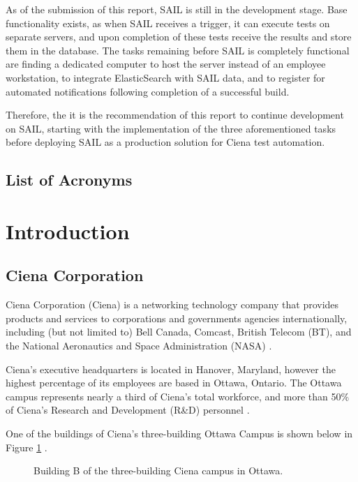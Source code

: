 \documentclass[10pt, titlepage, onecolumn, openany]{article}
\newcommand\mainmatter{
    \cleardoublepage
    \pagenumbering{arabic}
}
\begin{document}
As of the submission of this report, SAIL is still in the development stage.
Base functionality exists, as when SAIL receives a trigger, it can execute tests
on separate servers, and upon completion of these tests receive the results and
store them in the database. The tasks remaining before SAIL is completely
functional are finding a dedicated computer to host the server instead of an
employee workstation, to integrate ElasticSearch with SAIL data, and to register
for automated notifications following completion of a successful build.

Therefore, the it is the recommendation of this report to continue development
on SAIL, starting with the implementation of the three aforementioned tasks before
deploying SAIL as a production solution for Ciena test automation.

\clearpage
\begin{singlespace}
\tableofcontents
\clearpage
\section*{List of Acronyms}
\begin{center}
\end{center}
\end{singlespace}
\clearpage
\mainmatter
\setlength{\parindent}{0em}
\setlength{\parskip}{1em}
\section{Introduction}
\subsection{Ciena Corporation}
Ciena Corporation (Ciena) is a networking technology company that
provides products and services to corporations and governments
agencies internationally, including (but not limited to) Bell Canada,
Comcast, British Telecom (BT), and the National Aeronautics and Space
Administration (NASA) \cite{cienaCorpFacts}.

Ciena's executive headquarters is located in Hanover, Maryland,
however the highest percentage of its employees are based in Ottawa,
Ontario. The Ottawa campus represents nearly a third of Ciena's total
workforce, and more than 50\% of Ciena's Research and Development
(R\&D) personnel \cite{cienaWorking}.

One of the buildings of Ciena's three-building Ottawa Campus is shown
below in Figure \ref{bldg} \cite{buildingPic}.
\begin{figure}[ht!]
\centering
{}
\caption{Building B of the three-building Ciena campus in Ottawa.}
\label{bldg}
\end{figure}
\end{document}
